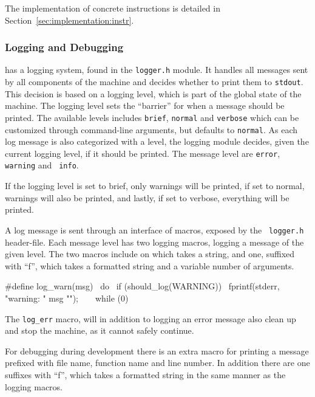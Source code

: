 The implementation of concrete instructions is detailed in
Section~\ref{sec:implementation:instr}.

\subsubsection{Logging and Debugging}
\label{sec:implementation:core:debug}

\thename{} has a logging system, found in the {\tt logger.h} module. It handles
all messages sent by all components of the machine and decides whether to print
them to {\tt stdout}. This decision is based on a logging level, which is part
of the global state of the machine. The logging level sets the ``barrier'' for
when a message should be printed. The available levels includes {\tt brief},
{\tt normal} and {\tt verbose} which can be customized through command-line
arguments, but defaults to {\tt normal}. As each log message is also categorized
with a level, the logging module decides, given the current logging level, if it
should be printed. The message level are {\tt error}, {\tt warning} and {\tt
  info}.

If the logging level is set to brief, only warnings will be printed, if set to
normal, warnings will also be printed, and lastly, if set to verbose, everything
will be printed.

A log message is sent through an interface of macros, exposed by the {\tt
  logger.h} header-file. Each message level has two logging macros, logging a
message of the given level. The two macros include on which takes a string, and
one, suffixed with ``f'', which takes a formatted string and a variable number
of arguments.

\begin{ccode}
#define log_warn(msg)                             \
  do {                                            \
      if (should_log(WARNING)) {                  \
          fprintf(stderr, "warning: " msg "\n");  \
      }                                           \
  } while (0)
\end{ccode}

The {\tt log\_err} macro, will in addition to logging an error message also
clean up and stop the machine, as it cannot safely continue.

For debugging during development there is an extra macro for printing a message
prefixed with file name, function name and line number. In addition there are
one suffixes with ``f'', which takes a formatted string in the same manner as
the logging macros. %

